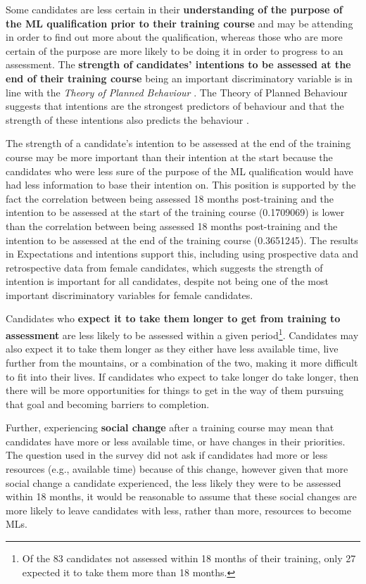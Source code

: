 \documentclass[a4paper,]{book}
\begin{document}
Some candidates are less certain in their \textbf{understanding of the purpose of the ML qualification prior to their training course} and may be attending in order to find out more about the qualification, whereas those who are more certain of the purpose are more likely to be doing it in order to progress to an assessment. The \textbf{strength of candidates' intentions to be assessed at the end of their training course} being an important discriminatory variable is in line with the \emph{Theory of Planned Behaviour} \citep{Ajzen1991}. The Theory of Planned Behaviour suggests that intentions are the strongest predictors of behaviour and that the strength of these intentions also predicts the behaviour \citep{Armitage2001}.

The strength of a candidate's intention to be assessed at the end of the training course may be more important than their intention at the start because the candidates who were less sure of the purpose of the ML qualification would have had less information to base their intention on. This position is supported by the fact the correlation between being assessed 18 months post-training and the intention to be assessed at the start of the training course (0.1709069) is lower than the correlation between being assessed 18 months post-training and the intention to be assessed at the end of the training course (0.3651245). The results in Expectations and intentions support this, including using prospective data and retrospective data from female candidates, which suggests the strength of intention is important for all candidates, despite not being one of the most important discriminatory variables for female candidates.

Candidates who \textbf{expect it to take them longer to get from training to assessment} are less likely to be assessed within a given period\footnote{Of the 83 candidates not assessed within 18 months of their training, only 27 expected it to take them more than 18 months.}. Candidates may also expect it to take them longer as they either have less available time, live further from the mountains, or a combination of the two, making it more difficult to fit into their lives. If candidates who expect to take longer do take longer, then there will be more opportunities for things to get in the way of them pursuing that goal and becoming barriers to completion.

Further, experiencing \textbf{social change} after a training course may mean that candidates have more or less available time, or have changes in their priorities. The question used in the survey did not ask if candidates had more or less resources (e.g., available time) because of this change, however given that more social change a candidate experienced, the less likely they were to be assessed within 18 months, it would be reasonable to assume that these social changes are more likely to leave candidates with less, rather than more, resources to become MLs.
\end{document}
